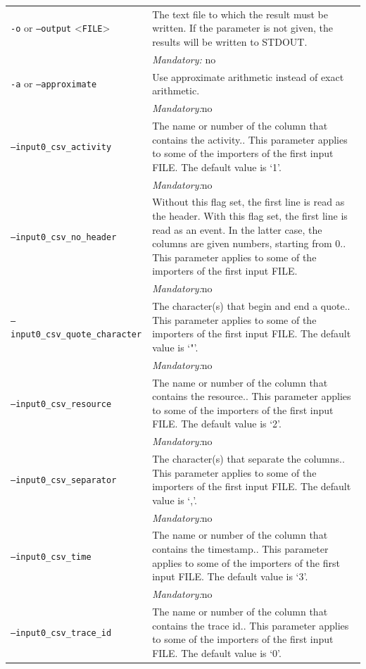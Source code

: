 {\begin{tabularx}{\linewidth}{lX}
\texttt{-o} or \texttt{--output} <\texttt{FILE}> &
The text file to which the result must be written. If the parameter is not given, the results will be written to STDOUT.\\
&\textit{Mandatory:} \quad no\\
\texttt{-a} or \texttt{--approximate} & Use approximate arithmetic instead of exact arithmetic.\\
&\textit{Mandatory:}\quad no\\
\texttt{--input0\_csv\_activity} & The name or number of the column that contains the activity.. This parameter applies to some of the importers of the first input FILE. The default value is `1'.\\
&\textit{Mandatory:}\quad no\\
\texttt{--input0\_csv\_no\_header} & Without this flag set, the first line is read as the header. 
    With this flag set, the first line is read as an event. In the latter case, the columns are given numbers, starting from 0.. This parameter applies to some of the importers of the first input FILE. \\
&\textit{Mandatory:}\quad no\\
\texttt{--input0\_csv\_quote\_character} & The character(s) that begin and end a quote.. This parameter applies to some of the importers of the first input FILE. The default value is `"'.\\
&\textit{Mandatory:}\quad no\\
\texttt{--input0\_csv\_resource} & The name or number of the column that contains the resource.. This parameter applies to some of the importers of the first input FILE. The default value is `2'.\\
&\textit{Mandatory:}\quad no\\
\texttt{--input0\_csv\_separator} & The character(s) that separate the columns.. This parameter applies to some of the importers of the first input FILE. The default value is `,'.\\
&\textit{Mandatory:}\quad no\\
\texttt{--input0\_csv\_time} & The name or number of the column that contains the timestamp.. This parameter applies to some of the importers of the first input FILE. The default value is `3'.\\
&\textit{Mandatory:}\quad no\\
\texttt{--input0\_csv\_trace\_id} & The name or number of the column that contains the trace id.. This parameter applies to some of the importers of the first input FILE. The default value is `0'.\\

\end{tabularx}}
